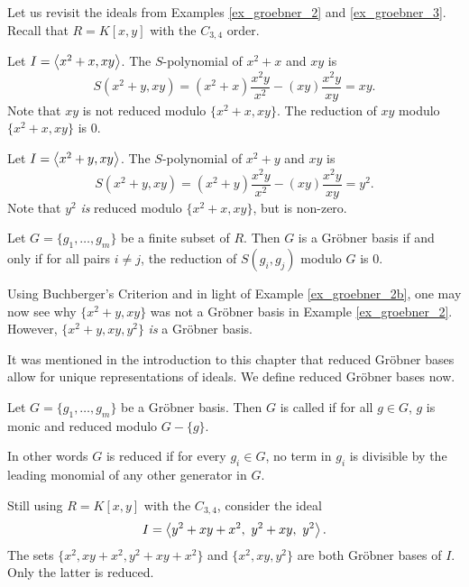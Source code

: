 Let us revisit the ideals from Examples \ref{ex_groebner_2} and \ref{ex_groebner_3}.
Recall that $R = K[x,y]$ with the $C_{3,4}$ order.
\begin{example}
  \label{ex_groebner_2b}
  Let $I = \left\langle x^2 + x, xy \right\rangle$.
  The $S$-polynomial of $x^2 + x$ and $xy$ is
  \[ S(x^2 + y, xy) = (x^2 + x) \frac{x^2y}{x^2} - (xy)\frac{x^2y}{xy} = xy. \]
  Note that $xy$ is not reduced modulo $\{x^2 + x, xy\}$.
  The reduction of $xy$ modulo $\{x^2 + x, xy\}$ is 0.
\end{example}
\begin{example}
  \label{ex_groebner_3b}
  Let $I = \left\langle x^2 + y, xy \right\rangle$.
  The $S$-polynomial of $x^2 + y$ and $xy$ is
  \[ S(x^2 + y, xy) = (x^2 + y) \frac{x^2y}{x^2} - (xy)\frac{x^2y}{xy} = y^2. \]
  Note that $y^2$ \emph{is} reduced modulo $\{x^2 + x, xy\}$, but is non-zero.
\end{example}

\begin{theorem}
  Let $G = \{g_1, \ldots, g_m\}$ be a finite subset of $R$.
  Then $G$ is a Gr\"obner basis if and only if for all pairs $i \neq j$,
  the reduction of $S(g_i, g_j)$ modulo $G$ is $0$.
\end{theorem}

Using Buchberger's Criterion and in light of Example \ref{ex_groebner_2b},
one may now see why $\{x^2 + y, xy\}$ was not a Gr\"obner basis in Example \ref{ex_groebner_2}.
However, $\{x^2 + y, xy, y^2\}$ \emph{is} a Gr\"obner basis.

It was mentioned in the introduction to this chapter
that reduced Gr\"obner bases allow for unique representations of ideals.
We define reduced Gr\"obner bases now.
\begin{definition}
  \label{def_reduced_groebner_basis}
  Let $G = \{g_1, \ldots, g_m\}$ be a Gr\"obner basis.
  Then $G$ is called  if for all $g \in G$, $g$ is monic and reduced modulo $G-\{g\}$.
\end{definition}
In other words $G$ is reduced if for every $g_i \in G$,
no term in $g_i$ is divisible by the leading monomial of any other generator in $G$.

\begin{example}
  \label{ex_groebner_4}
  Still using $R = K[x,y]$ with the $C_{3,4}$,
  consider the ideal
  \[I = \left\langle y^2 + xy + x^2, ~y^2 + xy, ~y^2 \right\rangle.\]
  The sets $\{x^2, xy + x^2, y^2 + xy + x^2\}$ and $\{x^2, xy, y^2\}$ are both Gr\"obner bases of $I$.
  Only the latter is reduced.
\end{example}

